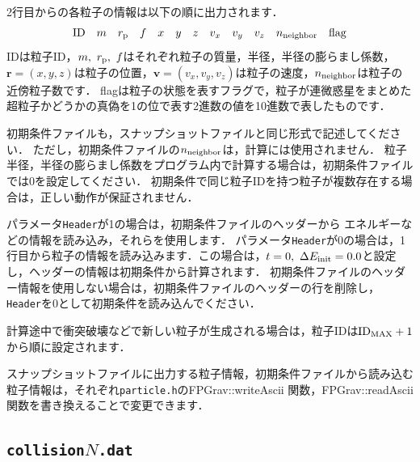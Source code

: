 \documentclass[12pt,a4paper,dvipdfmx]{jsarticle}
\begin{document}
2行目からの各粒子の情報は以下の順に出力されます．
\[
{\rm ID}\quad m\quad r_{\rm p}\quad f\quad x\quad y\quad z\quad v_{x}\quad v_{y} \quad v_{z}\quad n_{\rm neighbor} \quad {\rm flag}
\]
IDは粒子ID，$m,\ r_{\rm p},\ f$はそれぞれ粒子の質量，半径，半径の膨らまし係数，
$\bm{r}=(x,y,z)$は粒子の位置，$\bm{v}=(v_{x},v_{y},v_{z})$は粒子の速度，$n_{\rm neighbor}$は粒子の近傍粒子数です．
flagは粒子の状態を表すフラグで，粒子が連微惑星をまとめた超粒子かどうかの真偽を1の位で表す2進数の値を10進数で表したものです．


初期条件ファイルも，スナップショットファイルと同じ形式で記述してください．
ただし，初期条件ファイルの$n_{\rm neighbor}$は，計算には使用されません．
粒子半径，半径の膨らまし係数をプログラム内で計算する場合は，初期条件ファイルでは0を設定してください．
初期条件で同じ粒子IDを持つ粒子が複数存在する場合は，正しい動作が保証されません．

パラメータ\texttt{Header}が1の場合は，初期条件ファイルのヘッダーから
エネルギーなどの情報を読み込み，それらを使用します．
パラメータ\texttt{Header}が0の場合は，1行目から粒子の情報を読み込みます．この場合は，$t=0,\ \Delta E_{\rm init}=0.0$と設定し，ヘッダーの情報は初期条件から計算されます．
初期条件ファイルのヘッダー情報を使用しない場合は，初期条件ファイルのヘッダーの行を削除し，\texttt{Header}を0として初期条件を読み込んでください．

計算途中で衝突破壊などで新しい粒子が生成される場合は，粒子IDは${\rm ID}_{\rm MAX}+1$から順に設定されます．

スナップショットファイルに出力する粒子情報，初期条件ファイルから読み込む粒子情報は，それぞれ\texttt{particle.h}のFPGrav::writeAscii 関数，FPGrav::readAscii 関数を書き換えることで変更できます．

\subsection{\texttt{collision}$N$\texttt{.dat}}
\end{document}
